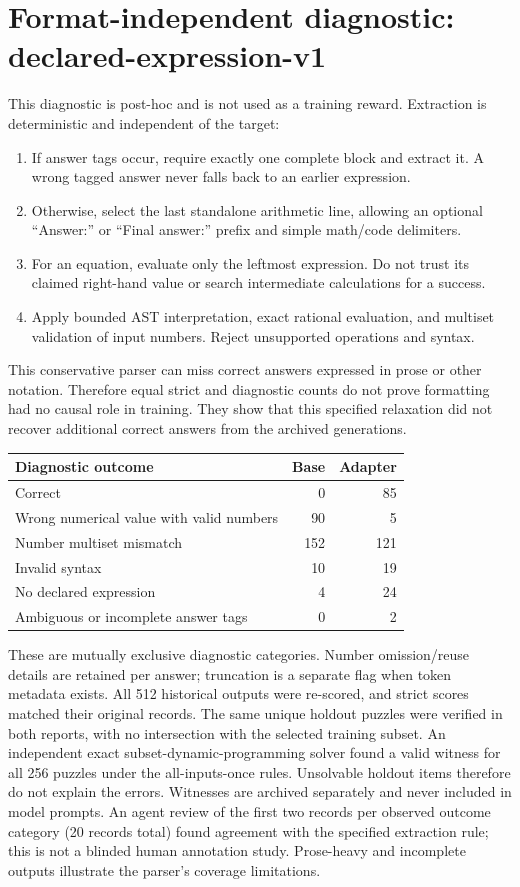 \documentclass[11pt]{article}
\begin{document}
\section{Format-independent diagnostic: declared-expression-v1}
This diagnostic is post-hoc and is not used as a training reward. Extraction is
deterministic and independent of the target:
\begin{enumerate}[nosep]
\item If answer tags occur, require exactly one complete block and extract it.
      A wrong tagged answer never falls back to an earlier expression.
\item Otherwise, select the last standalone arithmetic line, allowing an
      optional ``Answer:'' or ``Final answer:'' prefix and simple math/code delimiters.
\item For an equation, evaluate only the leftmost expression. Do not trust its
      claimed right-hand value or search intermediate calculations for a success.
\item Apply bounded AST interpretation, exact rational evaluation, and multiset
      validation of input numbers. Reject unsupported operations and syntax.
\end{enumerate}
This conservative parser can miss correct answers expressed in prose or other
notation. Therefore equal strict and diagnostic counts do not prove formatting
had no causal role in training. They show that this specified relaxation did not
recover additional correct answers from the archived generations.

\begin{center}
\begin{tabular}{lrr}
\toprule
Diagnostic outcome & Base & Adapter\\
\midrule
Correct & 0 & 85\\
Wrong numerical value with valid numbers & 90 & 5\\
Number multiset mismatch & 152 & 121\\
Invalid syntax & 10 & 19\\
No declared expression & 4 & 24\\
Ambiguous or incomplete answer tags & 0 & 2\\
\bottomrule
\end{tabular}
\end{center}
These are mutually exclusive diagnostic categories. Number omission/reuse details
are retained per answer; truncation is a separate flag when token metadata exists.
All 512 historical outputs were re-scored, and strict scores matched their
original records. The same unique holdout puzzles were verified in both reports,
with no intersection with the selected training subset.
An independent exact subset-dynamic-programming solver found a valid witness for
all 256 puzzles under the all-inputs-once rules. Unsolvable holdout items therefore
do not explain the errors. Witnesses are archived separately and never included
in model prompts. An agent review of the first two records per observed outcome
category (20 records total) found agreement with the specified extraction rule;
this is not a blinded human annotation study. Prose-heavy and incomplete outputs
illustrate the parser's coverage limitations.
\end{document}
